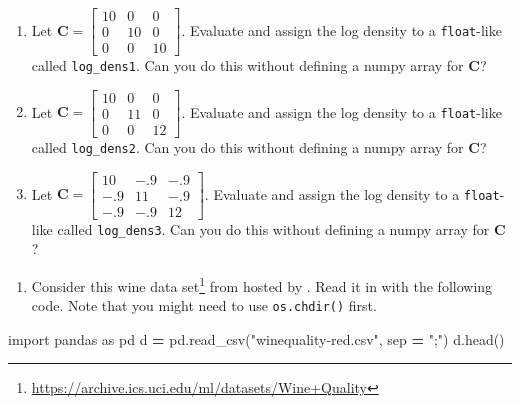 \documentclass[
  12pt,
  krantz2]{krantz}
\makeatletter
\newenvironment{Shaded}{\begin{snugshade}}{\end{snugshade}}
\newcommand{\ImportTok}[1]{#1}
\newcommand{\NormalTok}[1]{#1}
\newcommand{\OperatorTok}[1]{\textcolor[rgb]{0.43,0.43,0.43}{\textbf{#1}}}
\newcommand{\StringTok}[1]{\textcolor[rgb]{0.5,0.5,0.5}{#1}}
\providecommand{\tightlist}{%
  \setlength{\itemsep}{0pt}\setlength{\parskip}{0pt}}
\renewcommand{\href}[2]{#2\footnote{\url{#1}}}
\newenvironment{kframe}{%
\medskip{}
\setlength{\fboxsep}{.8em}
 \def\at@end@of@kframe{}%
 \ifinner\ifhmode%
  \def\at@end@of@kframe{\end{minipage}}%
  \begin{minipage}{\columnwidth}%
 \fi\fi%
 \def\FrameCommand##1{\hskip\@totalleftmargin \hskip-\fboxsep
 \colorbox{shadecolor}{##1}\hskip-\fboxsep
     \hskip-\linewidth \hskip-\@totalleftmargin \hskip\columnwidth}%
 \MakeFramed {\advance\hsize-\width
   \@totalleftmargin\z@ \linewidth\hsize
   \@setminipage}}%
 {\par\unskip\endMakeFramed%
 \at@end@of@kframe}
\renewenvironment{Shaded}{\begin{kframe}}{\end{kframe}}
\makeatother
\begin{document}
\begin{enumerate}
\def\labelenumi{\alph{enumi}.}
\item
  Let \(\mathbf{C} = \begin{bmatrix} 10 & 0 & 0 \\ 0 & 10 & 0 \\ 0 & 0 & 10 \end{bmatrix}\). Evaluate and assign the log density to a \texttt{float}-like called \texttt{log\_dens1}. Can you do this without defining a numpy array for \(\mathbf{C}\)?
\item
  Let \(\mathbf{C} = \begin{bmatrix} 10 & 0 & 0 \\ 0 & 11 & 0 \\ 0 & 0 & 12 \end{bmatrix}\). Evaluate and assign the log density to a \texttt{float}-like called \texttt{log\_dens2}. Can you do this without defining a numpy array for \(\mathbf{C}\)?
\item
  Let \(\mathbf{C} = \begin{bmatrix} 10 & -.9 & -.9 \\ -.9 & 11 & -.9 \\ -.9 & -.9 & 12 \end{bmatrix}\). Evaluate and assign the log density to a \texttt{float}-like called \texttt{log\_dens3}. Can you do this without defining a numpy array for \(\mathbf{C}\)?
\end{enumerate}

\begin{enumerate}
\def\labelenumi{\arabic{enumi}.}
\setcounter{enumi}{1}
\tightlist
\item
  Consider this \href{https://archive.ics.uci.edu/ml/datasets/Wine+Quality}{wine data set} from \citep{wine_data} hosted by \citep{uci_data}. Read it in with the following code. Note that you might need to use \texttt{os.chdir()} first.
\end{enumerate}

\begin{Shaded}
\begin{Highlighting}[]
\ImportTok{import}\NormalTok{ pandas }\ImportTok{as}\NormalTok{ pd}
\NormalTok{d }\OperatorTok{=}\NormalTok{ pd.read\_csv(}\StringTok{"winequality{-}red.csv"}\NormalTok{, sep }\OperatorTok{=} \StringTok{";"}\NormalTok{)}
\NormalTok{d.head()}
\end{Highlighting}
\end{Shaded}
\end{document}
